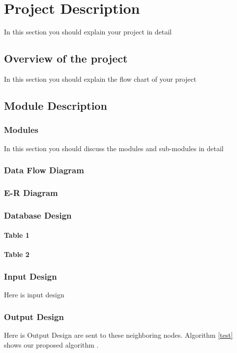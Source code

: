 \chapter{Project Description}
\noindent In this section you should explain your project in detail
\section{Overview of the project}
\noindent In this section you should explain the flow chart of your project
\section {Module Description}
\subsection {Modules}
\noindent In this section you should discuss the modules and sub-modules in detail
\subsection {Data Flow Diagram}
\subsection{E-R Diagram}
\subsection{Database Design}
\subsubsection{Table 1}
\subsubsection{Table 2}
\subsection {Input Design}
\noindent Here is input design
\subsection {Output Design}
\noindent Here is Output Design
are sent to these neighboring nodes. Algorithm \ref{test} shows our proposed algorithm \cite{vaibhav1}.\\

